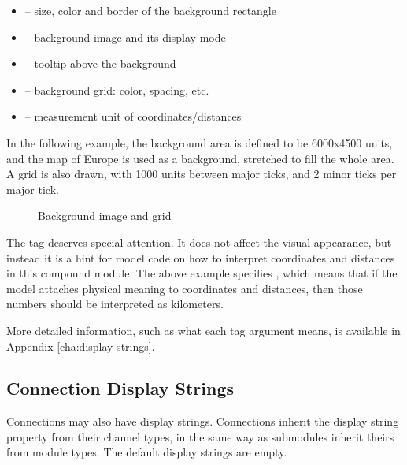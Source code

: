 \begin{itemize}
  \item {} -- size, color and border of the background rectangle
  \item {} -- background image and its display mode
  \item {} -- tooltip above the background
  \item {} -- background grid: color, spacing, etc.
  \item {} -- measurement unit of coordinates/distances
\end{itemize}

In the following example, the background area is defined to be 6000x4500
units, and the map of Europe is used as a background, stretched to fill the
whole area. A grid is also drawn, with 1000 units between major ticks,
and 2 minor ticks per major tick.

\begin{ned}
network EuropePlayground
{
    @display("bgb=6000,4500;bgi=maps/europe,s;bgg=1000,2,grey95;bgu=km");
\end{ned}

\begin{figure}[htbp]
  \begin{center}
    \caption{Background image and grid}
    \label{fig:graphics-bgtags}
  \end{center}
\end{figure}

The  tag deserves special attention. It does not affect
the visual appearance, but instead it is a hint for model code
on how to interpret coordinates and distances in this compound
module. The above example specifies , which means
that if the model attaches physical meaning to coordinates and
distances, then those numbers should be interpreted as kilometers.

More detailed information, such as what each tag argument means, is
available in Appendix \ref{cha:display-strings}.


\subsection{Connection Display Strings}
\label{sec:graphics:connection-displaystrings}

Connections may also have display strings. Connections inherit the
display string property from their channel types, in the same way as
submodules inherit theirs from module types. The default display
strings are empty.

